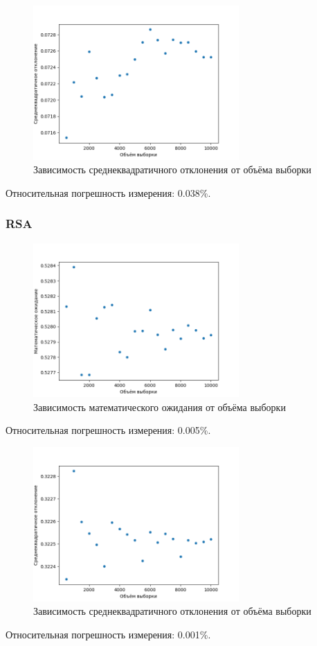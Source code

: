 \documentclass[bachelor, och, labwork]{SCWorks}
\begin{document}
\begin{figure}[H]
  \centering
  \includegraphics[width=0.7\textwidth]{rc_st.png}
  \caption{Зависимость среднеквадратичного отклонения от объёма выборки}
\end{figure}
Относительная погрешность измерения: 0.038\%.

\subsubsection{RSA}
\begin{figure}[H]
  \centering
  \includegraphics[width=0.7\textwidth]{rsa_me.png}
  \caption{Зависимость математического ожидания от объёма выборки}
\end{figure}
Относительная погрешность измерения: 0.005\%.

\begin{figure}[H]
  \centering
  \includegraphics[width=0.7\textwidth]{rsa_st.png}
  \caption{Зависимость среднеквадратичного отклонения от объёма выборки}
\end{figure}
Относительная погрешность измерения: 0.001\%.
\end{document}
